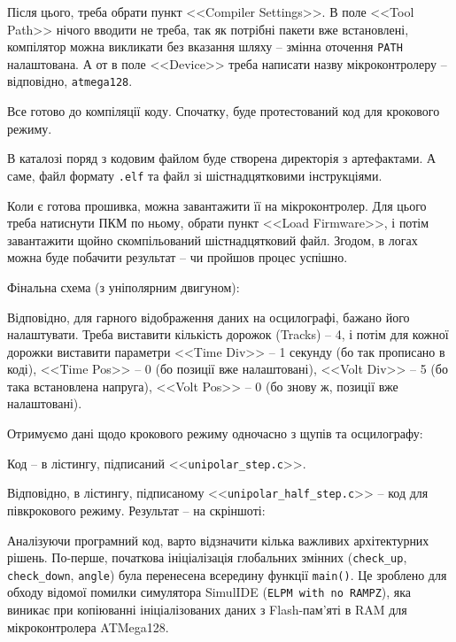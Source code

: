 \documentclass[14pt, a4paper]{extreport}
\begin{document}
	
	Після цього, треба обрати пункт <<Compiler Settings>>. В поле <<Tool Path>> нічого вводити не треба, так як потрібні пакети вже встановлені, компілятор можна викликати без вказання шляху -- змінна оточення \texttt{PATH} налаштована. А от в поле <<Device>> треба написати назву мікроконтролеру -- відповідно, \texttt{atmega128}.
	
	
	Все готово до компіляції коду. Спочатку, буде протестований код для крокового режиму.
	
	
	В каталозі поряд з кодовим файлом буде створена директорія з артефактами. А саме, файл формату \texttt{.elf} та файл зі шістнадцятковими інструкціями.
	
	
	Коли є готова прошивка, можна завантажити її на мікроконтролер. Для цього треба натиснути ПКМ по ньому, обрати пункт <<Load Firmware>>, і потім завантажити щойно скомпільований шістнадцятковий файл. Згодом, в логах можна буде побачити результат -- чи пройшов процес успішно.
	
	
	Фінальна схема (з уніполярним двигуном):
	
	
	Відповідно, для гарного відображення даних на осцилографі, бажано його налаштувати. Треба виставити кількість дорожок (Tracks) -- 4, і потім для кожної дорожки виставити параметри <<Time Div>> -- 1 секунду (бо так прописано в коді), <<Time Pos>> -- 0 (бо позиції вже налаштовані), <<Volt Div>> -- 5 (бо така встановлена напруга), <<Volt Pos>> -- 0 (бо знову ж, позиції вже налаштовані).
	
	
	Отримуємо дані щодо крокового режиму одночасно з щупів та осцилографу:
	
	
	Код -- в лістингу, підписаний <<\texttt{unipolar\_step.c}>>.
	
	Відповідно, в лістингу, підписаному <<\texttt{unipolar\_half\_step.c}>> -- код для півкрокового режиму. Результат -- на скріншоті:
	
	
	Аналізуючи програмний код, варто відзначити кілька важливих архітектурних рішень. По-перше, початкова ініціалізація глобальних змінних (\texttt{check\_up}, \texttt{check\_down}, \texttt{angle}) була перенесена всередину функції \texttt{main()}. Це зроблено для обходу відомої помилки симулятора SimulIDE (\texttt{ELPM with no RAMPZ}), яка виникає при копіюванні ініціалізованих даних з Flash-пам'яті в RAM для мікроконтролера ATMega128.
	
\end{document}
